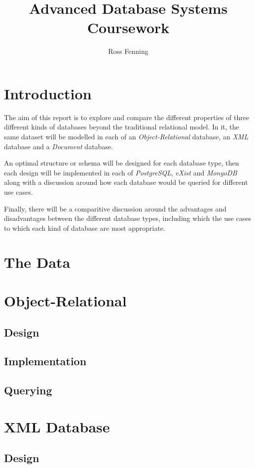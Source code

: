\documentclass[11pt,a4paper]{article}
\title{Advanced Database Systems Coursework}
\author{Ross Fenning}
\begin{document}
\maketitle

\section{Introduction}

The aim of this report is to explore and compare the different properties of
three different kinds of databases beyond the traditional relational model. In it,
the same dataset will be modelled in each of an \emph{Object-Relational} database,
an \emph{XML} database and a \emph{Document} database.

An optimal structure or schema will be designed for each database type, then
each design will be implemented in each of \emph{PostgreSQL}, \emph{eXist}
and \emph{MongoDB} along with a discussion around how each database would be
queried for different use cases.

Finally, there will be a comparitive discussion around the advantages and
disadvantages between the different database types, including which the use
cases to which each kind of database are most appropriate.

\section{The Data}

\section{Object-Relational}
\subsection{Design}
\subsection{Implementation}
\subsection{Querying}

\section{XML Database}
\subsection{Design}
\end{document}
